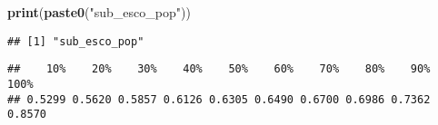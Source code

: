 \documentclass[
]{article}
\newenvironment{Shaded}{\begin{snugshade}}{\end{snugshade}}
\newcommand{\AttributeTok}[1]{\textcolor[rgb]{0.13,0.29,0.53}{#1}}
\newcommand{\DecValTok}[1]{\textcolor[rgb]{0.00,0.00,0.81}{#1}}
\newcommand{\FunctionTok}[1]{\textcolor[rgb]{0.13,0.29,0.53}{\textbf{#1}}}
\newcommand{\NormalTok}[1]{#1}
\newcommand{\SpecialCharTok}[1]{\textcolor[rgb]{0.81,0.36,0.00}{\textbf{#1}}}
\newcommand{\StringTok}[1]{\textcolor[rgb]{0.31,0.60,0.02}{#1}}
\begin{document}
\begin{Shaded}
\begin{Highlighting}[]
\FunctionTok{print}\NormalTok{(}\FunctionTok{paste0}\NormalTok{(}\StringTok{"sub\_esco\_pop"}\NormalTok{))}
\end{Highlighting}
\end{Shaded}

\begin{verbatim}
## [1] "sub_esco_pop"
\end{verbatim}

\begin{Shaded}
\end{Shaded}

\begin{verbatim}
##    10%    20%    30%    40%    50%    60%    70%    80%    90%   100% 
## 0.5299 0.5620 0.5857 0.6126 0.6305 0.6490 0.6700 0.6986 0.7362 0.8570
\end{verbatim}

\begin{Shaded}
\end{Shaded}
\end{document}

